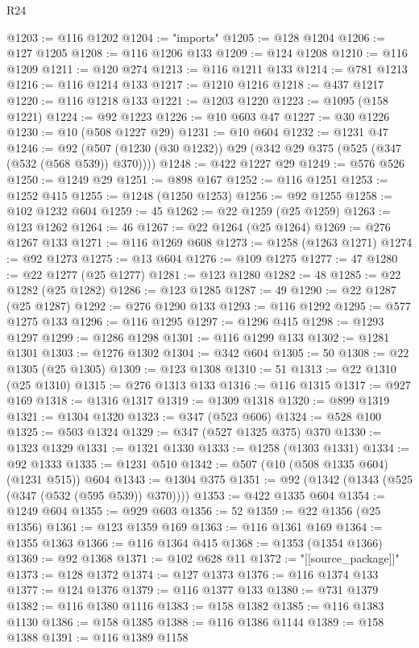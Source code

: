 \begin{lexlean}{R24}
\begin{coremodule}
{{{{{{{{{{{{{{{{{{{{{{{{{{{{{{{{{{{{{{{{{{{{{{{{{{{{{{{{{{{{{{{{{{{{{{{{{{{{{{{{{{{{{{{{{{{{{{{{{{{{{{{{{{{{{{{{{{{{{{{{{{{{{{{{{{{{{{{{{{{{{{{{{{{{{{{{{{{{{{{{{{{{{{{{{{{{{{{{{{{{{{{{{{{{{{{{{{{@1203 := @116 @1202
@1204 := "imports"
@1205 := @128 @1204
@1206 := @127 @1205
@1208 := @116 @1206 @133
@1209 := @124 @1208
@1210 := @116 @1209
@1211 := @120 @274
@1213 := @116 @1211 @133
@1214 := @781 @1213
@1216 := @116 @1214 @133
@1217 := @1210 @1216
@1218 := @437 @1217
@1220 := @116 @1218 @133
@1221 := @1203 @1220
@1223 := @1095 (@158 @1221)
@1224 := @92 @1223
@1226 := @10 @603 @47
@1227 := @30 @1226
@1230 := @10 (@508 @1227 @29)
@1231 := @10 @604
@1232 := @1231 @47
@1246 := @92 (@507 (@1230 (@30 @1232)) @29 (@342 @29 @375 (@525 (@347 (@532 (@568 @539)) @370))))
@1248 := @422 @1227 @29
@1249 := @576 @526
@1250 := @1249 @29
@1251 := @898 @167
@1252 := @116 @1251
@1253 := @1252 @415
@1255 := @1248 (@1250 @1253)
@1256 := @92 @1255
@1258 := @102 @1232 @604
@1259 := 45
@1262 := @22 @1259 (@25 @1259)
@1263 := @123 @1262
@1264 := 46
@1267 := @22 @1264 (@25 @1264)
@1269 := @276 @1267 @133
@1271 := @116 @1269 @608
@1273 := @1258 (@1263 @1271)
@1274 := @92 @1273
@1275 := @13 @604
@1276 := @109 @1275
@1277 := 47
@1280 := @22 @1277 (@25 @1277)
@1281 := @123 @1280
@1282 := 48
@1285 := @22 @1282 (@25 @1282)
@1286 := @123 @1285
@1287 := 49
@1290 := @22 @1287 (@25 @1287)
@1292 := @276 @1290 @133
@1293 := @116 @1292
@1295 := @577 @1275 @133
@1296 := @116 @1295
@1297 := @1296 @415
@1298 := @1293 @1297
@1299 := @1286 @1298
@1301 := @116 @1299 @133
@1302 := @1281 @1301
@1303 := @1276 @1302
@1304 := @342 @604
@1305 := 50
@1308 := @22 @1305 (@25 @1305)
@1309 := @123 @1308
@1310 := 51
@1313 := @22 @1310 (@25 @1310)
@1315 := @276 @1313 @133
@1316 := @116 @1315
@1317 := @927 @169
@1318 := @1316 @1317
@1319 := @1309 @1318
@1320 := @899 @1319
@1321 := @1304 @1320
@1323 := @347 (@523 @606)
@1324 := @528 @100
@1325 := @503 @1324
@1329 := @347 (@527 @1325 @375) @370
@1330 := @1323 @1329
@1331 := @1321 @1330
@1333 := @1258 (@1303 @1331)
@1334 := @92 @1333
@1335 := @1231 @510
@1342 := @507 (@10 (@508 @1335 @604) (@1231 @515)) @604
@1343 := @1304 @375
@1351 := @92 (@1342 (@1343 (@525 (@347 (@532 (@595 @539)) @370))))
@1353 := @422 @1335 @604
@1354 := @1249 @604
@1355 := @929 @603
@1356 := 52
@1359 := @22 @1356 (@25 @1356)
@1361 := @123 @1359 @169
@1363 := @116 @1361 @169
@1364 := @1355 @1363
@1366 := @116 @1364 @415
@1368 := @1353 (@1354 @1366)
@1369 := @92 @1368
@1371 := @102 @628 @11
@1372 := "[[source_package]]"
@1373 := @128 @1372
@1374 := @127 @1373
@1376 := @116 @1374 @133
@1377 := @124 @1376
@1379 := @116 @1377 @133
@1380 := @731 @1379
@1382 := @116 @1380 @1116
@1383 := @158 @1382
@1385 := @116 @1383 @1130
@1386 := @158 @1385
@1388 := @116 @1386 @1144
@1389 := @158 @1388
@1391 := @116 @1389 @1158
}}}}}}}}}}}}}}}}}}}}}}}}}}}}}}}}}}}}}}}}}}}}}}}}}}}}}}}}}}}}}}}}}}}}}}}}}}}}}}}}}}}}}}}}}}}}}}}}}}}}}}}}}}}}}}}}}}}}}}}}}}}}}}}}}}}}}}}}}}}}}}}}}}}}}}}}}}}}}}}}}}}}}}}}}}}}}}}}}}}}}}}}}}}}}}}}}}}
\end{coremodule}
\end{lexlean}
